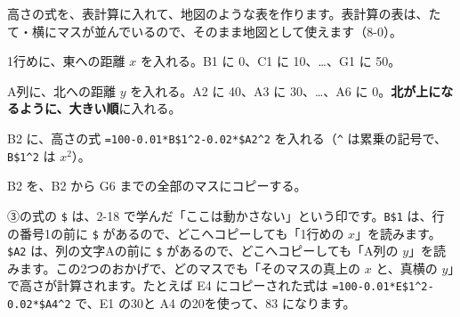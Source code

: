 
\label{bk:8-1:hyou}高さの式を、表計算に入れて、地図のような表を作ります。表計算の表は、たて・横にマスが並んでいるので、そのまま地図として使えます（8-0）。

\begin{enumerate}[label={\bkcircled[bkGreen]{\arabic*}}, leftmargin=2.4\zw, itemsep=1pt, topsep=3pt]
\item 1行めに、東への距離 $x$ を入れる。B1 に 0、C1 に 10、…、G1 に 50。
\item A列に、北への距離 $y$ を入れる。A2 に 40、A3 に 30、…、A6 に 0。\textbf{北が上になるように、大きい順}に入れる。
\item B2 に、高さの式 \texttt{=100-0.01*B\$1\^{}2-0.02*\$A2\^{}2} を入れる（\texttt{\^{}} は累乗の記号で、\texttt{B\$1\^{}2} は $x^2$）。
\item B2 を、B2 から G6 までの全部のマスにコピーする。
\end{enumerate}

\begin{bkcenter}
\par\vspace{1mm}
\label{bk:8-1:tab-hyou}
\end{bkcenter}

③の式の \texttt{\$} は、2-18 で学んだ「ここは動かさない」という印です。\texttt{B\$1} は、行の番号1の前に \texttt{\$} があるので、どこへコピーしても「1行めの $x$」を読みます。\texttt{\$A2} は、列の文字Aの前に \texttt{\$} があるので、どこへコピーしても「A列の $y$」を読みます。この2つのおかげで、どのマスでも「そのマスの真上の $x$ と、真横の $y$」で高さが計算されます。たとえば E4 にコピーされた式は \texttt{=100-0.01*E\$1\^{}2-0.02*\$A4\^{}2} で、E1 の30と A4 の20を使って、83 になります。

